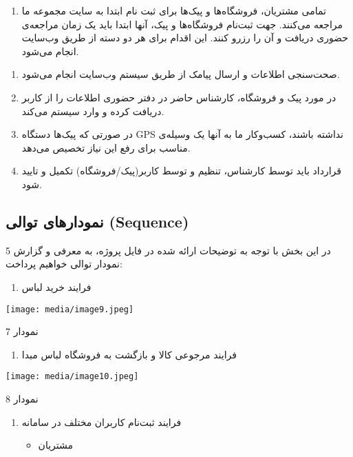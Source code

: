 \documentclass[]{article}
\begin{document}
\begin{enumerate}
\def\labelenumi{\arabic{enumi})}
\item
  تمامی مشتریان، فروشگاه‌ها و پیک‌ها برای ثبت نام ابتدا به سایت مجموعه
  ما مراجعه می‌کنند. جهت ثبت‌نام فروشگاه‌ها و پیک، آنها ابتدا باید یک
  زمان مراجعه‌ی حضوری دریافت و آن را رزرو کنند. این اقدام برای هر دو
  دسته از طریق وب‌سایت انجام می‌شود.
\end{enumerate}

\begin{enumerate}
\def\labelenumi{\arabic{enumi})}
\item
  صحت‌سنجی اطلاعات و ارسال پیامک از طریق سیستم وب‌سایت انجام می‌شود.
\item
  در مورد پیک و فروشگاه، کارشناس حاضر در دفتر حضوری اطلاعات را از کاربر
  دریافت کرده و وارد سیستم می‌کند.
\item
  در صورتی که پیک‌ها دستگاه GPS نداشته باشند، کسب‌وکار ما به آنها یک
  وسیله‌ی مناسب برای رفع این نیاز تخصیص می‌دهد.
\item
  قرارداد باید توسط کارشناس، تنظیم و توسط کاربر(پیک/فروشگاه) تکمیل و
  تایید شود.
\end{enumerate}

\subsection{نمودارهای توالی
(Sequence)}\label{ux646ux645ux648ux62fux627ux631ux647ux627ux6cc-ux62aux648ux627ux644ux6cc-sequence}

در این بخش با توجه به توضیحات ارائه شده در فایل پروژه، به معرفی و گزارش
5 نمودار توالی خواهیم پرداخت:

\begin{enumerate}
\def\labelenumi{\arabic{enumi})}
\item
  فرایند خرید لباس
\end{enumerate}

\texttt{[image: media/image9.jpeg]}

نمودار 7

\begin{enumerate}
\def\labelenumi{\arabic{enumi})}
\item
  فرایند مرجوعی کالا و بازگشت به فروشگاه لباس مبدا
\end{enumerate}

\texttt{[image: media/image10.jpeg]}

نمودار 8

\begin{enumerate}
\def\labelenumi{\arabic{enumi})}
\item
  فرایند ثبت‌نام کاربران مختلف در سامانه

  \begin{itemize}
  \item
    مشتریان
  \end{itemize}
\end{enumerate}
\end{document}

